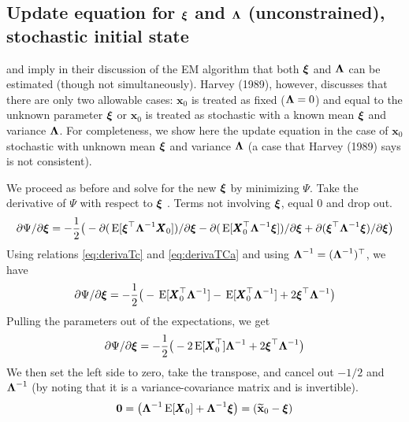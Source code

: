 \documentclass[]{article}
\def\xixi{\mbox{\boldmath $\xi$}}
\def\LAM{\mbox{\boldmath $\Lambda$}}
\def\XX{\mbox{$\pmb{X}$}}	\def\xx{\mbox{$\pmb{x}$}}
\def\E{\,\textup{\textrm{E}}}
\begin{document}
\subsection{Update equation for $\xixi$ and $\LAM$ (unconstrained), stochastic initial state}
\citet{ShumwayStoffer2006} and \citet{GhahramaniHinton1996} imply in their discussion of the EM algorithm that both $\xixi$ and $\LAM$ can be estimated (though not simultaneously).  Harvey (1989), however, discusses that there are only two allowable cases: $\xx_0$ is treated as fixed ($\LAM=0$) and equal to the unknown parameter $\xixi$ or $\xx_0$ is treated as stochastic with a known mean $\xixi$ and variance $\LAM$.  For completeness, we show here the update equation in the case of $\xx_0$ stochastic with unknown mean $\xixi$ and variance $\LAM$ (a case that Harvey (1989) says is not consistent).

We proceed as before and solve for the new $\xixi$ by minimizing $\Psi$.
Take the derivative of $\Psi$  with respect to $\xixi$ .  Terms not involving $\xixi$, equal 0 and drop out.  
\begin{equation}\label{eq:pi.unconstrained1}
\begin{split}
\partial\Psi/\partial\xixi = - \frac{1}{2} \big(-  \partial(\E[\xixi^\top\LAM^{-1}\XX_0])/\partial\xixi 
- \partial(\E[\XX_0^\top\LAM^{-1}\xixi])/\partial\xixi 
 + \partial(\xixi^\top\LAM^{-1}\xixi)/\partial\xixi \big)
\end{split}
\end{equation}
Using relations \eqref{eq:derivaTc} and \eqref{eq:derivaTCa} and using $\LAM^{-1} = (\LAM^{-1})^\top$, we have
\begin{equation}\label{eq:pi.unconstrained2}
\partial\Psi/\partial\xixi = - \frac{1}{2} \big(- \E[ \XX_0^\top\LAM^{-1} ] 
- \E[ \XX_0^\top\LAM^{-1} ] + 2\xixi^\top\LAM^{-1} \big)
\end{equation}
Pulling the parameters out of the expectations, we get
\begin{equation}\label{eq:pi.unconstrained3}
\partial\Psi/\partial\xixi = - \frac{1}{2} \big(- 2\E[ \XX_0^\top ]\LAM^{-1} + 2\xixi^\top\LAM^{-1} \big)
\end{equation}
We then set the left side to zero, take the transpose, and cancel out $-1/2$ and $\LAM^{-1}$ (by noting that it is a variance-covariance matrix and is invertible).   
\begin{equation}\label{eq:pi.unconstrained4}
\mathbf{0} = \big(\LAM^{-1}\E[ \XX_0 ] + \LAM^{-1}\xixi \big)=(\widetilde{\mbox{$\mathbf x$}}_0 - \xixi)
\end{equation}
\end{document}
